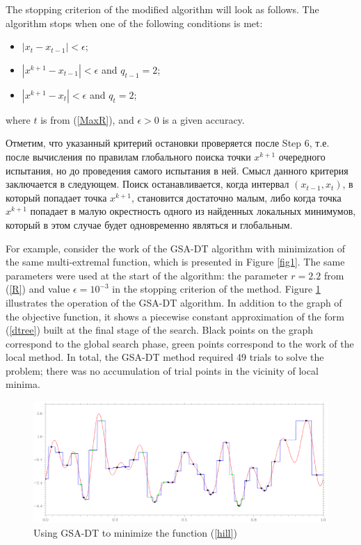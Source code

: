 \documentclass[entropy,article,submit,moreauthors,pdftex]{Definitions/mdpi}
\begin{document}
The stopping criterion of the modified algorithm will look as follows. 
The algorithm stops when one of the following conditions is met:

\begin{itemize}
	\item $|x_{t} - x_{t-1}|<\epsilon$;
	\item $|x^{k+1} - x_{t-1}|<\epsilon$ and $q_{t-1} = 2$;
	\item $|x^{k+1}-x_{t}|<\epsilon$ and $q_{t} = 2$;
\end{itemize}
where $t$ is from (\ref{MaxR}), and $\epsilon>0$ is a given accuracy.

Отметим, что указанный критерий остановки проверяется после Step 6, т.е. после вычисления по правилам глобального поиска точки $x^{k+1}$ очередного испытания, но до проведения самого испытания в ней. Смысл данного критерия заключается в следующем. Поиск останавливается, когда интервал $(x_{t-1},x_t)$, в который попадает точка $x^{k+1}$, становится достаточно малым, либо когда точка $x^{k+1}$ попадает в малую окрестность одного из найденных локальных минимумов, который в этом случае будет одновременно являться и глобальным.

For example, consider the work of the GSA-DT algorithm with minimization of the same multi-extremal function, which is presented in Figure \ref{fig1}. The same parameters were used at the start of the algorithm: the parameter  $r=2.2$ from (\ref{R}) and value $\epsilon = 10^{-3}$ in the stopping criterion of the method. 
Figure \ref{fig2} illustrates the operation of the GSA-DT algorithm. In addition to the graph of the objective function, it shows a piecewise constant approximation of the form (\ref{dtree}) built at the final stage of the search. Black points on the graph correspond to the global search phase, green points correspond to the work of the local method. In total, the GSA-DT method required 49 trials to solve the problem; there was no accumulation of trial points in the vicinity of local minima.
 
\begin{figure}[H]
\includegraphics[width=1.0\linewidth]{HillTree90.png}
\caption{Using GSA-DT to minimize the function (\ref{hill}) }
\label{fig2}
\end{figure}   
\end{document}

